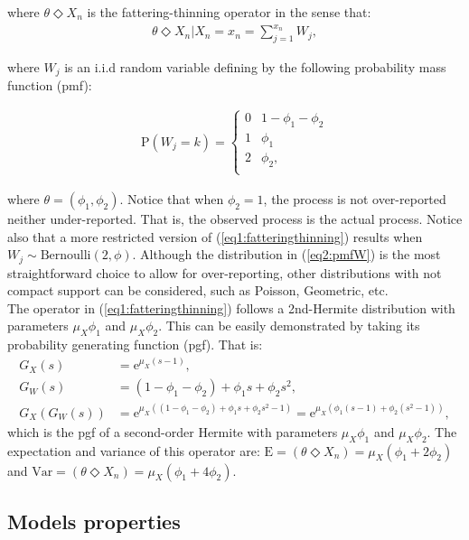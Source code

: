 \documentclass[11pt,a4paper]{article}
\begin{document}
\noindent where $\theta \Diamond X_n$ is the fattering-thinning operator in the sense that:
\begin{align}\label{eq1:fatteringthinning}
\theta \Diamond X_n|X_n=x_n=\sum_{j=1}^{x_n}W_j,
\end{align}

\noindent where $W_j$ is an i.i.d random variable defining by the following probability mass function (pmf):

\begin{align}\label{eq2:pmfW}
\textrm{P}(W_j=k)=\begin{cases} 
0 &  1-\phi_1-\phi_2 \\
1& \phi_1 \\
2& \phi_2, \\
\end{cases}
\end{align}

\noindent where $\theta=(\phi_1,\phi_2)$. Notice that when $\phi_2=1$, the process is not over-reported neither under-reported. That is, the observed process is the actual process. Notice also that a more restricted version of (\ref{eq1:fatteringthinning}) results when $W_j \sim \textrm{Bernoulli}(2,\phi)$. Although the distribution in (\ref{eq2:pmfW}) is the most straightforward choice to allow for over-reporting, other distributions with not compact support can be considered, such as Poisson, Geometric, etc. \\
The operator in (\ref{eq1:fatteringthinning}) follows a 2nd-Hermite distribution with parameters $\mu_X\phi_1$ and $\mu_X\phi_2$. This can be easily demonstrated by taking its probability generating function (pgf). That is:
\begin{align}
G_X(s)&=\textrm{e}^{\mu_X(s-1)}, \label{eq3:pgfpox}\\
G_W(s)&=(1-\phi_1-\phi_2)+\phi_1s+\phi_2s^2, \label{eq3:pgfw}\\
G_X\left(G_W(s)\right)&=\textrm{e}^{\mu_X\left((1-\phi_1-\phi_2)+\phi_1s+\phi_2s^2-1\right)}=\textrm{e}^{\mu_X\left(\phi_1(s-1)+\phi_2(s^2-1)\right)} \label{eq3:pgffath} ,
\end{align}
which is the pgf of a second-order Hermite with parameters $\mu_X\phi_1$ and $\mu_X\phi_2$. The expectation and variance of this operator are: $\textrm{E}=\left(\theta \Diamond X_n\right)=\mu_X\left(\phi_1+2\phi_2\right)$ and $\textrm{Var}=\left(\theta \Diamond X_n\right)=\mu_X\left(\phi_1+4\phi_2\right)$.

\subsection{Models properties}
\end{document}
